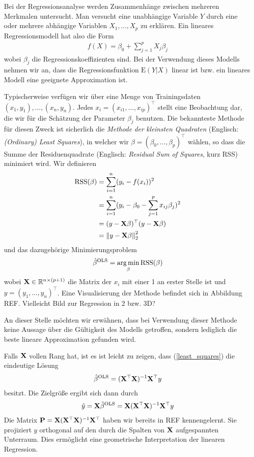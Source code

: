 Bei der Regressionsanalyse werden Zusammenhänge zwischen
mehreren Merkmalen untersucht. Man versucht eine unabhängige Variable $Y$ durch eine oder mehrere abhängige Variablen $X_1, \ldots, X_p$ zu erklären. Ein lineares Regressionsmodell hat also die Form
\begin{align}
\label{linear_model}
f(X) = \beta_0 + \sum_{j=1}^p X_j\beta_j
\end{align}
wobei $\beta_j$ die Regressionskoeffizienten sind.
Bei der Verwendung dieses Modells nehmen wir an, dass die Regressionsfunktion $\text{E}(Y|X)$ linear ist bzw. ein lineares Modell eine geeignete Approximation ist.

Typischerweise verfügen wir über eine Menge von Trainingsdaten $(x_1, y_1), \ldots, (x_n, y_n)$. Jedes $x_i = (x_{i1}, \ldots, x_{ip})^{\top}$ stellt eine Beobachtung dar, die wir für die Schätzung der Parameter $\beta_j$ benutzen. Die bekannteste Methode für diesen Zweck ist sicherlich die \textit{Methode der kleinsten Quadraten} (Englisch: \textit{(Ordinary) Least Squares}), in welcher wir $\beta = (\beta_0, \ldots, \beta_p)^{\top}$ wählen, so dass die Summe der Residuenquadrate (Englisch: \textit{Residual Sum of Squares}, kurz RSS) minimiert wird. Wir definieren
\begin{align}
\label{RSS}
\text{RSS}(\beta) & = \sum_{i=1}^{n}(y_i - f(x_i))^2\\
& = \sum_{i=1}^{n}(y_i - \beta_0 - \sum_{j=1}^p x_{ij}\beta_j)^2\\
& = (y - \mathbf{X} \beta)^{\top}(y-\mathbf{X} \beta)\\
& = \left\lVert y - \mathbf{X} \beta \right\rVert_{2}^{2}
\end{align}
und das dazugehörige Minimierungsproblem
\begin{align}
\label{least_squares}
\hat{\beta}^{\text{OLS}} = \operatorname*{arg\,min}_{\beta} \text{RSS}(\beta)
\end{align}
wobei $\mathbf{X} \in \mathbb{R}^{n \times (p+1)}$ die Matrix der $x_i$ mit einer 1 an erster Stelle ist und $y = (y_1, \ldots, y_n)^{\top}$. Eine Visualisierung der Methode befindet sich in Abbildung REF. Vielleicht Bild zur Regression in 2 bzw. 3D?

An dieser Stelle möchten wir erwähnen, dass bei Verwendung dieser Methode keine Aussage über die Gültigkeit des Modells getroffen, sondern lediglich die beste lineare Approximation gefunden wird.

Falls $\mathbf{X}$ vollen Rang hat, ist es ist leicht zu zeigen, dass (\ref{least_squares}) die eindeutige Lösung
\begin{align}
\hat{\beta}^{\text{OLS}} = (\mathbf{X}^{\top}\mathbf{X})^{-1}\mathbf{X}^{\top} y
\end{align}
besitzt. Die Zielgröße ergibt sich dann durch
\begin{align}
\hat{y} = \mathbf{X} \hat{\beta}^{\text{OLS}} = \mathbf{X} (\mathbf{X}^{\top}\mathbf{X})^{-1}\mathbf{X}^{\top} y
\end{align}
Die Matrix $\mathbf{P} = \mathbf{X} (\mathbf{X}^{\top}\mathbf{X})^{-1}\mathbf{X}^{\top}$ haben wir bereits in REF kennengelernt. Sie projiziert $y$ orthogonal auf den durch  die Spalten von $\mathbf{X}$ aufgespannten Unterraum. Dies ermöglicht eine geometrische Interpretation der linearen Regression.

